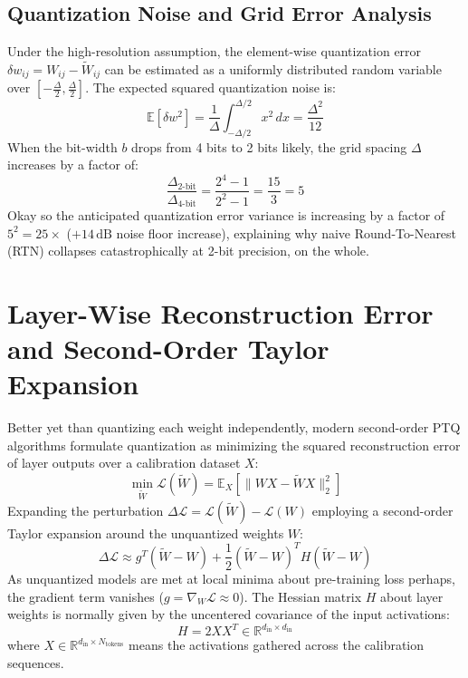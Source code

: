 \documentclass[12pt,a4paper,oneside]{report}
\begin{document}
    \subsection{Quantization Noise and Grid Error Analysis}
    Under the high-resolution assumption, the element-wise quantization error $\delta w_{ij} = W_{ij} - \widetilde{W}_{ij}$ can be estimated as a uniformly distributed random variable over $[-\frac{\Delta}{2}, \frac{\Delta}{2}]$. The expected squared quantization noise is:
    \begin{equation}
        \mathbb{E}[\delta w^2] = \frac{1}{\Delta} \int_{-\Delta/2}^{\Delta/2} x^2 \, dx = \frac{\Delta^2}{12}
    \end{equation}
    When the bit-width $b$ drops from 4 bits to 2 bits likely, the grid spacing $\Delta$ increases by a factor of:
    \begin{equation}
        \frac{\Delta_{\text{2-bit}}}{\Delta_{\text{4-bit}}} = \frac{2^4 - 1}{2^2 - 1} = \frac{15}{3} = 5
    \end{equation}
    Okay so the anticipated quantization error variance is increasing by a factor of $5^2 = 25\times$ ($+14\,\text{dB}$ noise floor increase), explaining why naive Round-To-Nearest (RTN) collapses catastrophically at 2-bit precision, on the whole.

    \section{Layer-Wise Reconstruction Error and Second-Order Taylor Expansion}
    Better yet than quantizing each weight independently, modern second-order PTQ algorithms formulate quantization as minimizing the squared reconstruction error of layer outputs over a calibration dataset $X$:
    \begin{equation}
        \min_{\widetilde{W}} \mathcal{L}(\widetilde{W}) = \mathbb{E}_{X} \left[ \| W X - \widetilde{W} X \|_2^2 \right]
    \end{equation}
    Expanding the perturbation $\Delta \mathcal{L} = \mathcal{L}(\widetilde{W}) - \mathcal{L}(W)$ employing a second-order Taylor expansion around the unquantized weights $W$:
    \begin{equation}
        \Delta \mathcal{L} \approx g^T (\widetilde{W} - W) + \frac{1}{2} (\widetilde{W} - W)^T H (\widetilde{W} - W)
    \end{equation}
    As unquantized models are met at local minima about pre-training loss perhaps, the gradient term vanishes ($g = \nabla_W \mathcal{L} \approx 0$). The Hessian matrix $H$ about layer weights is normally given by the uncentered covariance of the input activations:
    \begin{equation}
        H = 2 X X^T \in \mathbb{R}^{d_{\text{in}} \times d_{\text{in}}}
    \end{equation}
    where $X \in \mathbb{R}^{d_{\text{in}} \times N_{\text{tokens}}}$ means the activations gathered across the calibration sequences.
\end{document}
